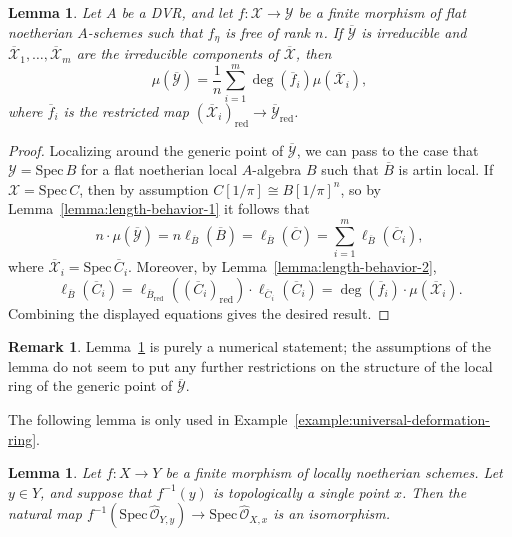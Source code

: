 \documentclass[11pt,reqno]{amsart}
\newtheorem{lemma}[theorem]{Lemma}
\theoremstyle{definition}
\newtheorem{remark}[theorem]{Remark}
\renewcommand{\rm}{\mathrm}
\newcommand{\Spec}{\mathrm{Spec} \,}
\newcommand{\cO}{\mathcal{O}}
\newcommand{\sX}{{\mathscr X}}
\newcommand{\sY}{{\mathscr Y}}
\newcommand{\ov}[1]{\overline{#1}}
\begin{document}
\begin{lemma}\label{lemma:multiplicity-behavior}
    Let $A$ be a DVR, and let $f\colon \sX \to \sY$ be a finite morphism of flat noetherian $A$-schemes such that $f_\eta$ is free of rank $n$. If $\ov{\sY}$ is irreducible and $\ov{\sX}_1, \dots, \ov{\sX}_m$ are the irreducible components of $\ov{\sX}$, then
    \[
    \mu(\ov{\sY}) = \frac{1}{n}\sum_{i=1}^m \deg(\ov{f}_i) \mu(\ov{\sX}_i),
    \]
    where $\ov{f}_i$ is the restricted map $(\ov{\sX}_i)_{\rm{red}} \to \ov{\sY}_{\rm{red}}$.
\end{lemma}

\begin{proof}
    Localizing around the generic point of $\ov{\sY}$, we can pass to the case that $\sY = \Spec B$ for a flat noetherian local $A$-algebra $B$ such that $\ov{B}$ is artin local. If $\sX = \Spec C$, then by assumption $C[1/\pi] \cong B[1/\pi]^n$, so by Lemma~\ref{lemma:length-behavior-1} it follows that
    \[
    n\cdot\mu(\ov{\sY}) = n\ell_{\ov{B}}(\ov{B}) = \ell_{\ov{B}}(\ov{C}) = \sum_{i=1}^m \ell_{\ov{B}}(\ov{C}_i),
    \]
    where $\ov{\sX}_i = \Spec \ov{C}_i$. Moreover, by Lemma~\ref{lemma:length-behavior-2},
    \[
    \ell_{\ov{B}}(\ov{C}_i) = \ell_{\ov{B}_{\rm{red}}}((\ov{C}_i)_{\rm{red}}) \cdot \ell_{\ov{C}_i}(\ov{C}_i) = \deg(\ov{f}_i) \cdot \mu(\ov{\sX}_i).
    \]
    Combining the displayed equations gives the desired result.
\end{proof}

\begin{remark}
    Lemma~\ref{lemma:multiplicity-behavior} is purely a numerical statement; the assumptions of the lemma do not seem to put any further restrictions on the structure of the local ring of the generic point of $\ov{\sY}$.
\end{remark}



The following lemma is only used in Example~\ref{example:universal-deformation-ring}.

\begin{lemma}\label{lemma:preimage-of-completion}
    Let $f\colon X \to Y$ be a finite morphism of locally noetherian schemes. Let $y \in Y$, and suppose that $f^{-1}(y)$ is topologically a single point $x$. Then the natural map $f^{-1}(\Spec \widehat{\cO}_{Y, y}) \to \Spec \widehat{\cO}_{X, x}$ is an isomorphism.
\end{lemma}
\end{document}

